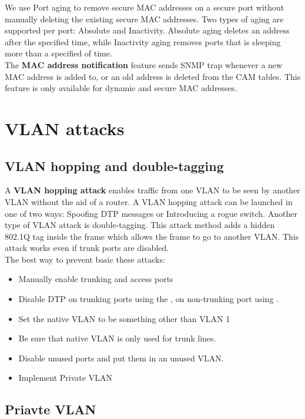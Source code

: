 We use Port aging to remove secure MAC addresses on a secure port without manually deleting the existing secure MAC addresses. Two types of aging are supported per port: Absolute and Inactivity. Absolute aging deletes an address after the specified time, while Inactivity aging removes ports that is sleeping more than a specified of time.\\

The \textbf{MAC address notification} feature sends SNMP trap whenever a new MAC address is added to, or an old address is deleted from the CAM tables. This feature is only available for dynamic and secure MAC addresses.

\section{VLAN attacks}

\subsection{VLAN hopping and double-tagging}

A \textbf{VLAN hopping attack} enables traffic from one VLAN to be seen by another VLAN without the aid of a router. A VLAN hopping attack can be launched in one of two ways: Spoofing DTP messages or Introducing a rogue switch. Another type of VLAN attack is double-tagging. This attack method adds a hidden 802.1Q tag inside the frame which allows the frame to go to another VLAN. This attack works even if trunk ports are disabled.\\

The best way to prevent basic these attacks:

\begin{itemize}
\item Manually enable trunking and access ports
\item Disable DTP on trunking ports using the , on non-trunking port using .
\item Set the native VLAN to be something other than VLAN 1
\item Be sure that native VLAN is only used for trunk lines.
\item Disable unused ports and put them in an unused VLAN.
\item Implement Private VLAN
\end{itemize}

\subsection{Priavte VLAN}

